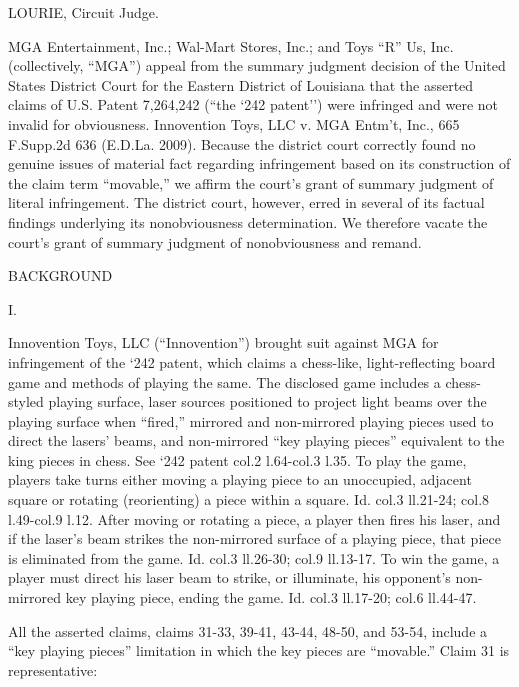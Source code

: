 
LOURIE, Circuit Judge.

MGA Entertainment, Inc.; Wal-Mart Stores, Inc.; and Toys ``R'' Us, Inc.
(collectively, ``MGA'') appeal from the summary judgment decision of the United
States District Court for the Eastern District of Louisiana that the asserted
claims of U.S. Patent 7,264,242 (``the `242 patent'') were infringed and were
not invalid for obviousness. Innovention Toys, LLC v. MGA Entm't, Inc., 665
F.Supp.2d 636 (E.D.La. 2009). Because the district court correctly found no
genuine issues of material fact regarding infringement based on its
construction of the claim term ``movable,'' we affirm the court's grant of
summary judgment of literal infringement. The district court, however, erred in
several of its factual findings underlying its nonobviousness determination. We
therefore vacate the court's grant of summary judgment of nonobviousness and
remand.

{\centering
BACKGROUND
\par}

{\centering
I.
\par}

Innovention Toys, LLC (``Innovention'') brought suit against MGA for
infringement of the `242 patent, which claims a chess-like, light-reflecting
board game and methods of playing the same. The disclosed game includes a
chess-styled playing surface, laser sources positioned to project light beams
over the playing surface when ``fired,'' mirrored and non-mirrored playing
pieces used to direct the lasers' beams, and non-mirrored ``key playing
pieces'' equivalent to the king pieces in chess. See `242 patent col.2
l.64-col.3 l.35. To play the game, players take turns either moving a playing
piece to an unoccupied, adjacent square or rotating (reorienting) a piece
within a square. Id. col.3 ll.21-24; col.8 l.49-col.9 l.12. After moving or
rotating a piece, a player then fires his laser, and if the laser's beam
strikes the non-mirrored surface of a playing piece, that piece is eliminated
from the game. Id. col.3 ll.26-30; col.9 ll.13-17. To win the game, a player
must direct his laser beam to strike, or illuminate, his opponent's
non-mirrored key playing piece, ending the game. Id. col.3 ll.17-20; col.6
ll.44-47.

All the asserted claims, claims 31-33, 39-41, 43-44, 48-50, and 53-54, include a
``key playing pieces'' limitation in which the key pieces are ``movable.''
Claim 31 is representative:

